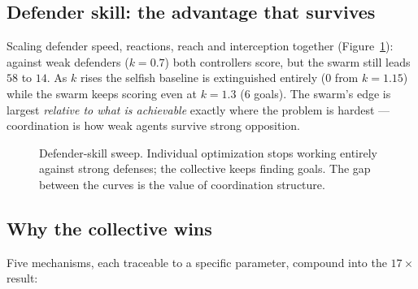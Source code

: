 \documentclass[11pt,a4paper]{article}
\begin{document}
\subsection{Defender skill: the advantage that survives}

Scaling defender speed, reactions, reach and interception together (Figure~\ref{fig:defskill}):
against weak defenders ($k = 0.7$) both controllers score, but the swarm still leads $58$ to
$14$. As $k$ rises the selfish baseline is extinguished entirely ($0$ from $k = 1.15$) while the
swarm keeps scoring even at $k = 1.3$ ($6$ goals). The swarm's edge is largest \emph{relative to
what is achievable} exactly where the problem is hardest --- coordination is how weak agents
survive strong opposition.

\begin{figure}[H]
\centering
{}
\caption{Defender-skill sweep. Individual optimization stops working entirely against strong
defenses; the collective keeps finding goals. The gap between the curves is the value of
coordination structure.}
\label{fig:defskill}
\end{figure}

\subsection{Why the collective wins}\label{sec:whywin}

Five mechanisms, each traceable to a specific parameter, compound into the $17\times$ result:
\end{document}
